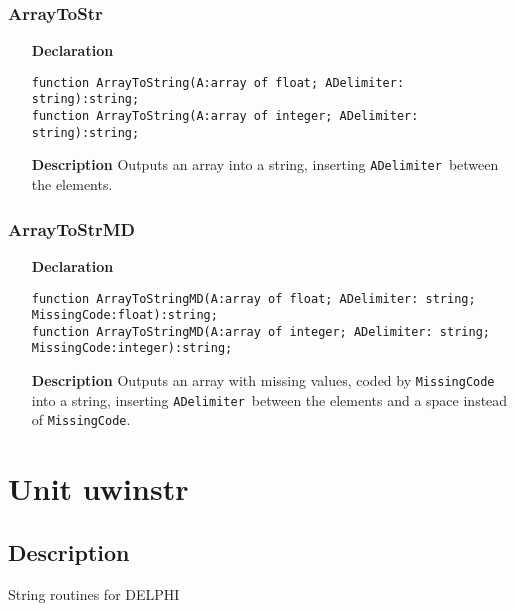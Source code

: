 \documentclass[12pt,a4paper,oneside]{report}
\newcommand{\lmath}[1]{   %
	\marginpar{\vspace{#1} 
		\begin{flushright}
			LMath
	\end{flushright} }
}
\newcommand{\declarationitem}[1]{\textbf{#1}}
\newcommand{\descriptiontitle}[1]{\textbf{#1}}
\newcommand{\code}[1]{\texttt{#1}}
\begin{document}
\subsubsection{ArrayToStr}
\lmath{-24pt}
\label{ustrings-ArrayToStr}
\begin{itemize}\item[\declarationitem{Declaration}\hfill]
	\begin{flushleft}
		\code{function ArrayToString(A:array of float; ADelimiter: string):string;}\\
		\code{function ArrayToString(A:array of integer; ADelimiter: string):string;}
	\end{flushleft}
	\par
	\item[\descriptiontitle{Description}]
	Outputs an array into a string, inserting \code{ADelimiter}\ between the elements. 
\end{itemize}

\subsubsection{ArrayToStrMD}
\lmath{-24pt}
\label{ustrings-ArrayToStrMD}
\begin{itemize}\item[\declarationitem{Declaration}\hfill]
	\begin{flushleft}
		\code{function ArrayToStringMD(A:array of float; ADelimiter: string; MissingCode:float):string;}\\
		\code{function ArrayToStringMD(A:array of integer; ADelimiter: string; MissingCode:integer):string;}
	\end{flushleft}
	\par
	\item[\descriptiontitle{Description}]
	Outputs an array with missing values, coded by \code{MissingCode} into a string, inserting \code{ADelimiter}\ between the elements and a space instead of \code{MissingCode}. 
\end{itemize}


\section{Unit uwinstr}
\label{uwinstr}
\subsection{Description}
String routines for DELPHI 
\end{document}
